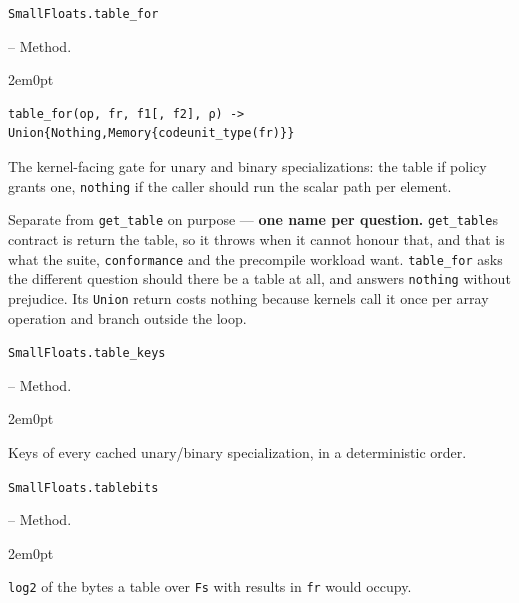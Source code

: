 \par\medskip\noindent\begin{minipage}{\linewidth}
\hypertarget{2063626746625773781}{\texttt{SmallFloats.table\_\allowbreak{}for}}  -- {Method.}
\nopagebreak
\begin{adjustwidth}{2em}{0pt}


\begin{verbatim}
table_for(op, fr, f1[, f2], ρ) -> Union{Nothing,Memory{codeunit_type(fr)}}
\end{verbatim}

The kernel-facing gate for unary and binary specializations: the table if policy grants one, \texttt{nothing} if the caller should run the scalar path per element.

Separate from \texttt{get\_\allowbreak{}table} on purpose — \textbf{one name per question.} \texttt{get\_\allowbreak{}table}{\textquotesingle}s contract is {\textquotedbl}return the table{\textquotedbl}, so it throws when it cannot honour that, and that is what the suite, \texttt{conformance} and the precompile workload want. \texttt{table\_\allowbreak{}for} asks the different question {\textquotedbl}should there be a table at all{\textquotedbl}, and answers \texttt{nothing} without prejudice. Its \texttt{Union} return costs nothing because kernels call it once per array operation and branch outside the loop.



\end{adjustwidth}
\end{minipage}
\par\medskip

\par\medskip\noindent\begin{minipage}{\linewidth}
\hypertarget{14316915538520331686}{\texttt{SmallFloats.table\_\allowbreak{}keys}}  -- {Method.}
\nopagebreak
\begin{adjustwidth}{2em}{0pt}

Keys of every cached unary/binary specialization, in a deterministic order.



\end{adjustwidth}
\end{minipage}
\par\medskip

\par\medskip\noindent\begin{minipage}{\linewidth}
\hypertarget{12092491969860390893}{\texttt{SmallFloats.tablebits}}  -- {Method.}
\nopagebreak
\begin{adjustwidth}{2em}{0pt}

\texttt{log2} of the bytes a table over \texttt{Fs} with results in \texttt{fr} would occupy.



\end{adjustwidth}
\end{minipage}
\par\medskip

